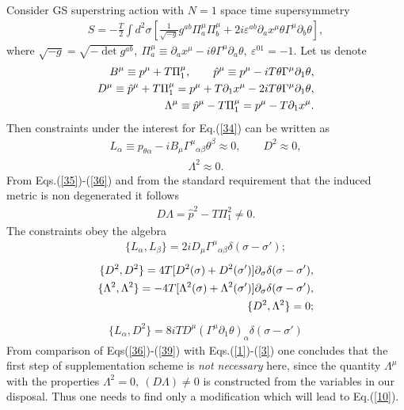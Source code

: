 \documentclass[a4paper]{article}
\begin{document}
Consider GS superstring action with $N=1$ space time supersymmetry
\begin{eqnarray}\label{34}
S=-\frac{T}{2}\int d^2\sigma
\left[\frac{1}{\sqrt{-g}}g^{ab}
\Pi_a^\mu \Pi_b^\mu+2i\varepsilon^{ab}\partial_ax^\mu
\theta\Gamma^\mu\partial_b\theta\right],
\end{eqnarray}
where $\sqrt{-g}=\sqrt{-\det{g^{ab}}}, ~ \Pi^\mu_a\equiv
\partial_ax^\mu-i\theta\Gamma^\mu\partial_a\theta, ~ 
\varepsilon^{01}=-1$. Let us denote
\begin{eqnarray}\label{35}
B^\mu\equiv p^\mu+T\Pi_1^\mu, \qquad 
\hat p^\mu\equiv p^\mu-iT\theta\Gamma^\mu\partial_1\theta, \cr 
D^\mu\equiv\hat p^\mu+T\Pi_1^\mu=
p^\mu+T\partial_1x^\mu-2iT\theta\Gamma^\mu\partial_1\theta, \cr 
\Lambda^\mu\equiv\hat p^\mu-T\Pi_1^\mu=p^\mu-T\partial_1x^\mu.
\end{eqnarray}
Then constraints under the interest for Eq.(\ref{34}) can be written as 
\begin{eqnarray}\label{36}
L_\alpha\equiv p_{\theta\alpha}- iB_\mu{\Gamma^\mu}_{\alpha\beta}
\theta^\beta\approx 0, \qquad D^2\approx0,
\end{eqnarray}
\begin{eqnarray}\label{37}
\Lambda^2\approx0.
\end{eqnarray}
From Eqs.(\ref{35})-(\ref{36}) and from the standard requirement that 
the induced metric is non degenerated it follows 
\begin{eqnarray}\label{38}
D\Lambda=\hat p^2-T\Pi_1^2\ne 0.
\end{eqnarray}
The constraints obey the algebra 
\begin{eqnarray}\label{39}
\{L_\alpha,L_\beta\}=2iD_\mu{\Gamma^\mu}_{\alpha\beta}
\delta(\sigma-\sigma ');
\end{eqnarray}
\begin{eqnarray}\label{40}
\{D^2, D^2\}=4T[D^2(\sigma)+D^2(\sigma ')]
\partial_\sigma\delta(\sigma-\sigma '), \cr 
\{\Lambda^2, \Lambda^2\}=-4T[\Lambda^2(\sigma)+\Lambda^2(\sigma ')]
\partial_\sigma\delta(\sigma-\sigma '), \cr
\{D^2, \Lambda^2\}=0;
\end{eqnarray}
\begin{eqnarray}\label{41}
\{L_\alpha, D^2\}=8iTD^\mu(\Gamma^\mu\partial_1\theta)_\alpha
\delta(\sigma-\sigma ')
\end{eqnarray}
From comparison of Eqs(\ref{36})-(\ref{39}) with Eqs.(\ref{1})-(\ref{3}) 
one concludes that the first step of supplementation scheme is 
{\em not necessary} here, since the quantity $\Lambda^\mu$ with the 
properties $\Lambda^2=0, ~ (D\Lambda)\ne 0$ is constructed from the 
variables in our disposal. Thus one needs to find only a modification 
which will lead to Eq.(\ref{10}). 
\end{document}
